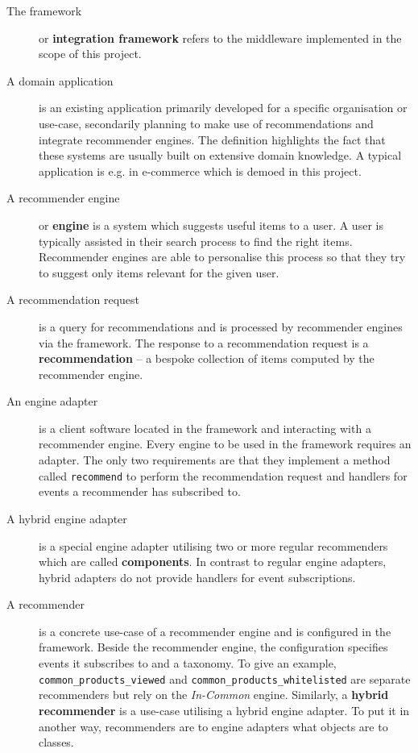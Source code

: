 \begin{description}

\item[\textnormal{The} framework] or \textbf{integration framework} refers to the middleware implemented in the scope of this project.

\item[\textnormal{A} domain application] is an existing application primarily developed for a specific organisation or use-case, secondarily planning to make use of recommendations and integrate recommender engines. The definition highlights the fact that these systems are usually built on extensive domain knowledge. A typical application is e.g. in e-commerce which is demoed in this project.

\item[\textnormal{A} recommender engine] or \textbf{engine} is a system which suggests useful items to a user. A user is typically assisted in their search process to find the right items. Recommender engines are able to personalise this process so that they try to suggest only items relevant for the given user.

\item[\textnormal{A} recommendation request] is a query for recommendations and is processed by recommender engines via the framework. The response to a recommendation request is a \textbf{recommendation} -- a bespoke collection of items computed by the recommender engine.

\item[\textnormal{An} engine adapter] is a client software located in the framework and interacting with a recommender engine. Every engine to be used in the framework requires an adapter. The only two requirements are that they implement a method called \texttt{recommend} to perform the recommendation request and handlers for events a recommender has subscribed to.

\item[\textnormal{A} hybrid engine adapter] is a special engine adapter utilising two or more regular recommenders which are called \textbf{components}. In contrast to regular engine adapters, hybrid adapters do not provide handlers for event subscriptions.

\item[\textnormal{A} recommender] is a concrete use-case of a recommender engine and is configured in the framework. Beside the recommender engine, the configuration specifies events it subscribes to and a taxonomy. To give an example, \texttt{common_products_viewed} and \texttt{common_products_whitelisted} are separate recommenders but rely on the \emph{In-Common} engine. Similarly, a \textbf{hybrid recommender} is a use-case utilising a hybrid engine adapter. To put it in another way, recommenders are to engine adapters what objects are to classes.


\end{description}

